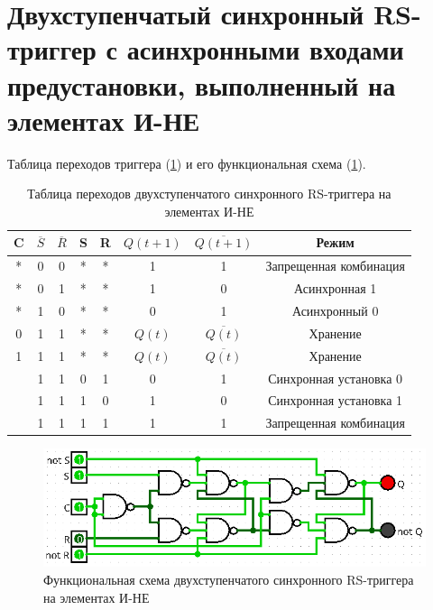 \documentclass[14pt, a4paper]{extreport}
\newcommand\clockbt{%
	\begin{tikzpicture}[scale=0.25pt]
		\draw (0,0) -- (1,0) -- (1,1) -- (2,1);
	\end{tikzpicture}%
}
\begin{document}
\section{Двухступенчатый синхронный RS-триггер с асинхронными входами предустановки, выполненный на элементах И-НЕ}
Таблица переходов триггера (\cref{tab:dual-sync-rs-nand}) и его функциональная схема (\cref{fig:dual-sync-rs-nand}).

\begin{table}[H]
	\caption{Таблица переходов двухступенчатого синхронного RS-триггера на элементах И-НЕ}
	\label{tab:dual-sync-rs-nand}
	\begin{tabular}{|c|c|c|c|c|c|c|c|}
		\hline
		C & $\overline{S}$ & $\overline{R}$ & S & R & $Q(t + 1)$ & $\overline{Q(t + 1)}$ & Режим \\
		\hline
		* & 0 & 0 & * & * & 1 & 1 & Запрещенная комбинация \\
		\hline
		* & 0 & 1 & * & * & 1 & 0 & Асинхронная 1 \\
		\hline
		* & 1 & 0 & * & * & 0 & 1 & Асинхронный 0 \\
		\hline
		0 & 1 & 1 & * & * & $Q(t)$ & $\overline{Q(t)}$ & Хранение \\
		\hline
		1 & 1 & 1 & * & * & $Q(t)$ & $\overline{Q(t)}$ & Хранение \\
		\hline
		\clockbt & 1 & 1 & 0 & 1 & 0 & 1 & Синхронная установка 0 \\
		\hline
		\clockbt & 1 & 1 & 1 & 0 & 1 & 0 & Синхронная установка 1 \\
		\hline
		\clockbt & 1 & 1 & 1 & 1 & 1 & 1 & Запрещенная комбинация \\
		\hline
	\end{tabular}
\end{table}

\begin{figure}[H]
	\caption{Функциональная схема двухступенчатого синхронного RS-триггера на элементах И-НЕ}
	\label{fig:dual-sync-rs-nand}
	\includegraphics[width=\textwidth]{dual-sync-rs-nand}
\end{figure}
\end{document}
